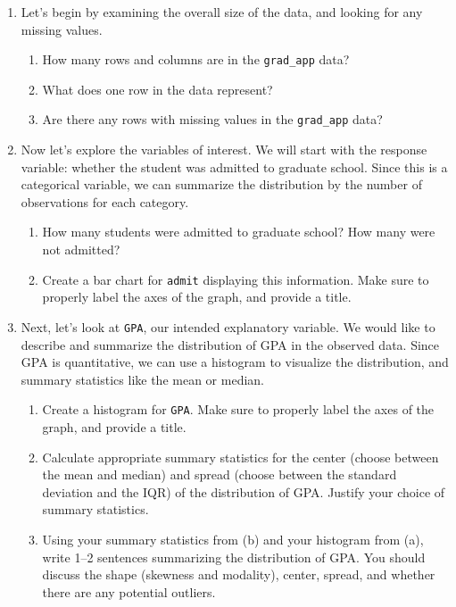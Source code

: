 \documentclass[11pt]{article}
\begin{document}
\begin{enumerate}
\item Let's begin by examining the overall size of the data, and looking for any missing values.

\begin{enumerate}
\item How many rows and columns are in the \verb;grad_app; data?

\item What does one row in the data represent?

\item Are there any rows with missing values in the \verb;grad_app; data? 
\end{enumerate}

\item Now let's explore the variables of interest. We will start with the response variable: whether the student was admitted to graduate school. Since this is a categorical variable, we can summarize the distribution by the number of observations for each category.

\begin{enumerate}
\item How many students were admitted to graduate school? How many were not admitted?

\item Create a bar chart for \verb;admit; displaying this information. Make sure to properly label the axes of the graph, and provide a title.
\end{enumerate}

\item Next, let's look at \verb;GPA;, our intended explanatory variable. We would like to describe and summarize the distribution of GPA in the observed data. Since GPA is quantitative, we can use a histogram to visualize the distribution, and summary statistics like the mean or median.

\begin{enumerate}
\item Create a histogram for \verb;GPA;. Make sure to properly label the axes of the graph, and provide a title.

\item Calculate appropriate summary statistics for the center (choose between the mean and median) and spread (choose between the standard deviation and the IQR) of the distribution of GPA. Justify your choice of summary statistics.

\item Using your summary statistics from (b) and your histogram from (a), write 1--2 sentences summarizing the distribution of GPA. You should discuss the shape (skewness and modality), center, spread, and whether there are any potential outliers.
\end{enumerate}


\end{enumerate}
\end{document}
